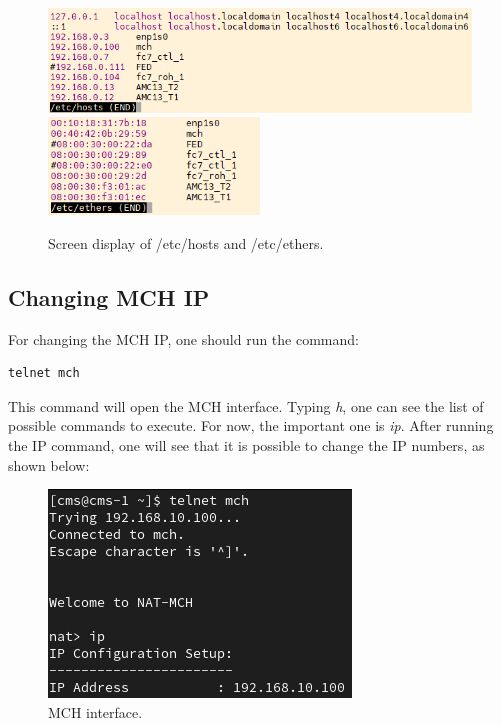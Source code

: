 \documentclass[10pt,a4paper]{article}
\begin{document}
\begin{figure}[h!]
\centering
        \includegraphics[width=\textwidth]{hosts.png}
        \includegraphics[width=0.5\textwidth]{ethers.png}
  \caption{Screen display of /etc/hosts and /etc/ethers.}
  \label{GoodHosts}
\end{figure}

\newpage 

\subsection{Changing MCH IP}

For changing the MCH IP, one should run the command:

\begin{framed}
\begin{verbatim}
telnet mch
\end{verbatim}
\end{framed}

This command will open the MCH interface. Typing \textit{h}, one can see the list of possible commands to execute. For now, the important one is \textit{ip}. After running the IP command, one will see that it is possible to change the IP numbers, as shown below:

\begin{figure}[h!]
\centering
 \includegraphics[width=.5\linewidth]{Pictures/telnet.png} 
  \caption{MCH interface.}
  \label{telnet}
\end{figure}
\end{document}
